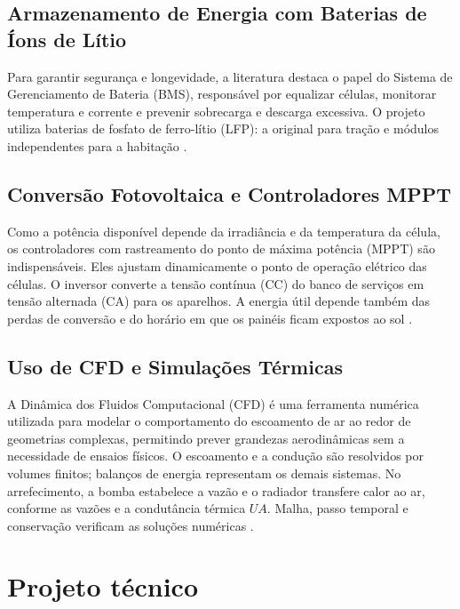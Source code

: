\documentclass[12pt,a4paper]{article}
\begin{document}
\subsection{Armazenamento de Energia com Baterias de Íons de Lítio}
Para garantir segurança e longevidade, a literatura destaca o papel do Sistema de
Gerenciamento de Bateria (BMS), responsável por equalizar células, monitorar temperatura
e corrente e prevenir sobrecarga e descarga excessiva. O projeto utiliza baterias de fosfato de ferro-lítio (LFP):
a original para tração e módulos independentes para a habitação \cite{fiatsk,pylontech}.

\subsection{Conversão Fotovoltaica e Controladores MPPT}
Como a potência disponível depende da irradiância e da temperatura da célula, os
controladores com rastreamento do ponto de máxima potência (MPPT) são indispensáveis. Eles ajustam
dinamicamente o ponto de operação elétrico das células. O inversor converte a tensão
contínua (CC) do banco de serviços em tensão alternada (CA) para os aparelhos. A energia útil
depende também das perdas de conversão e do horário em que os painéis ficam expostos
ao sol \cite{maxeon,victron}.

\subsection{Uso de CFD e Simulações Térmicas}
A Dinâmica dos Fluidos Computacional (CFD) é uma ferramenta numérica utilizada para
modelar o comportamento do escoamento de ar ao redor de geometrias complexas,
permitindo prever grandezas aerodinâmicas sem a necessidade de ensaios físicos.
O escoamento e a condução são resolvidos por volumes finitos; balanços de energia
representam os demais sistemas. No arrefecimento, a bomba estabelece a vazão e o
radiador transfere calor ao ar, conforme as vazões e a condutância térmica $UA$.
Malha, passo temporal e conservação verificam as soluções numéricas
\cite{celik,incropera,apostila}.

\clearpage
\section{Projeto técnico}
\end{document}
